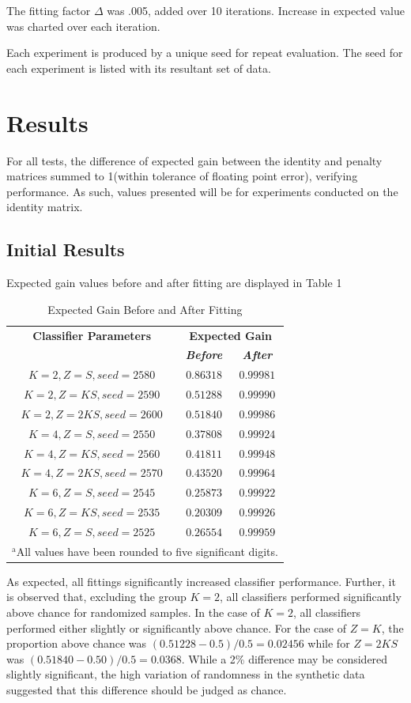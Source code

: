 \documentclass[10pt, conference]{IEEEtran}
\begin{document}
The fitting factor $\Delta$ was .005, added over 10 iterations. Increase in expected value was charted over each iteration.

Each experiment is produced by a unique seed for repeat evaluation. The seed for each experiment is listed with its resultant set of data. 
\section{Results}
For all tests, the difference of expected gain between the identity and penalty matrices summed to 1(within tolerance of floating point error), verifying performance. As such, values presented will be for experiments conducted on the identity matrix. 
\subsection{Initial Results}
Expected gain values before and after fitting are displayed in Table 1
\begin{table}[htbp]
\caption{Expected Gain Before and After Fitting}
\begin{center}
\begin{tabular}{|c|c|c|}
\hline
\textbf{Classifier Parameters}&\multicolumn{2}{|c|}{\textbf{Expected Gain}} \\
\cline{2-3} 
\textbf{} & \textbf{\textit{Before}}& \textbf{\textit{After}}\\
\hline
$K=2,Z=S,seed=2580$&$0.86318$&$0.99981$\\
\hline
$K=2,Z=KS,seed=2590$&$0.51288$&$0.99990$ \\
\hline
$K=2,Z=2KS,seed=2600$&$0.51840$ & $0.99986$  \\
\hline
$K=4,Z=S,seed=2550$&$0.37808$&$0.99924$  \\
\hline
$K=4,Z=KS,seed=2560$&$0.41811$&$0.99948$  \\
\hline
$K=4,Z=2KS,seed=2570$&$0.43520$&$0.99964$ \\
\hline
$K=6,Z=S,seed=2545$&$0.25873$&$0.99922$ \\
\hline
$K=6,Z=KS,seed=2535$&$0.20309$&$0.99926$  \\
\hline
$K=6,Z=S,seed=2525$&$0.26554$&$0.99959$  \\
\hline
\multicolumn{3}{l}{$^{\mathrm{a}}$All values have been rounded to five significant digits.}
\end{tabular}
\label{tab1}
\end{center}
\end{table}
As expected, all fittings significantly increased classifier performance. Further, it is observed that, excluding the group $K=2$, all classifiers performed significantly above chance for randomized samples. In the case of $K=2$, all classifiers performed either slightly or significantly above chance. For the case of $Z=K$,  the proportion above chance was $(0.51228-0.5)/0.5 = 0.02456$ while for $Z=2KS$ was $(0.51840-0.50)/0.5=0.0368.$ While a 2\% difference may be considered slightly significant, the high variation of randomness in the synthetic data suggested that this difference should be judged as chance.
\end{document}

